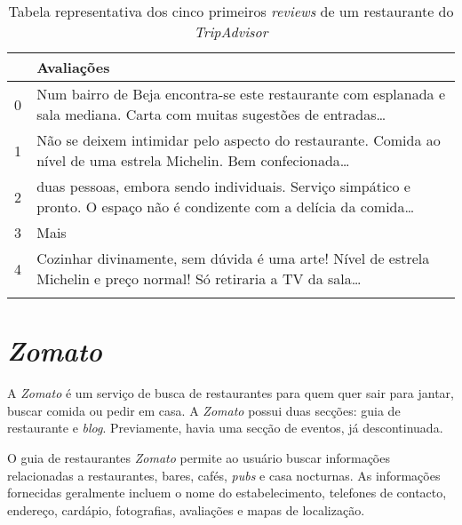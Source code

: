 \begin{table}[!ht]
  \centering
  \begin{adjustbox}{width=\columnwidth,center}
    \begin{tabular}{|l|l|}
      \hline
      ~      & Avaliações                                                                                                                  \\ \hline
      0      & Num bairro de Beja encontra-se este restaurante com esplanada e sala mediana. Carta com muitas sugestões de entradas\ldots  \\ \hline
      1      & Não se deixem intimidar pelo aspecto do restaurante. Comida ao nível de uma estrela Michelin. Bem confecionada\ldots        \\ \hline
      2      & duas pessoas, embora sendo individuais. Serviço simpático e pronto. O espaço não é condizente com a delícia da comida\ldots \\ \hline
      3      & Mais                                                                                                                        \\ \hline
      4      & Cozinhar divinamente, sem dúvida é uma arte! Nível de estrela Michelin e preço normal! Só retiraria a TV da sala\ldots      \\ \hline                                                                                                                     \\ \hline
    \end{tabular}
  \end{adjustbox}
  \caption{Tabela representativa dos cinco primeiros \textit{reviews} de um restaurante do \textit{TripAdvisor}}
  \label{table:6}
\end{table}

\section{\textit{Zomato}}
A \textit{Zomato} é um serviço de busca de restaurantes para quem quer sair para jantar, buscar comida ou pedir em casa. A \textit{Zomato} possui duas secções: guia de restaurante e \textit{blog}. Previamente, havia uma secção de eventos, já descontinuada.

O guia de restaurantes \textit{Zomato} permite ao usuário buscar informações relacionadas a restaurantes, bares, cafés, \textit{pubs} e casa nocturnas. As informações fornecidas geralmente incluem o nome do estabelecimento, telefones de contacto, endereço, cardápio, fotografias, avaliações e mapas de localização.

